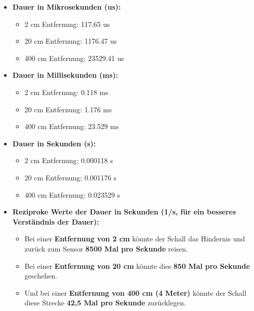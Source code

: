\documentclass{vorlage-design-main}
\begin{document}
\begin{itemize}

\item
  \textbf{Dauer in Mikrosekunden (us):}

  \begin{itemize}
  
  \item
    2 cm Entfernung: 117.65 us
  \item
    20 cm Entfernung: 1176.47 us
  \item
    400 cm Entfernung: 23529.41 us
  \end{itemize}
\item
  \textbf{Dauer in Millisekunden (ms):}

  \begin{itemize}
  
  \item
    2 cm Entfernung: 0.118 ms
  \item
    20 cm Entfernung: 1.176 ms
  \item
    400 cm Entfernung: 23.529 ms
  \end{itemize}
\item
  \textbf{Dauer in Sekunden (s):}

  \begin{itemize}
  
  \item
    2 cm Entfernung: 0.000118 s
  \item
    20 cm Entfernung: 0.001176 s
  \item
    400 cm Entfernung: 0.023529 s
  \end{itemize}
\item
  \textbf{Reziproke Werte der Dauer in Sekunden (1/s, für ein besseres
  Verständnis der Dauer):}

  \begin{itemize}
  
  \item
    Bei einer \textbf{Entfernung von 2 cm} könnte der Schall das
    Hindernis und zurück zum Sensor \textbf{8500 Mal pro Sekunde}
    reisen.
  \item
    Bei einer \textbf{Entfernung von 20 cm} könnte dies \textbf{850 Mal
    pro Sekunde} geschehen.
  \item
    Und bei einer \textbf{Entfernung von 400 cm (4 Meter)} könnte der
    Schall diese Strecke \textbf{42,5 Mal pro Sekunde} zurücklegen.
  \end{itemize}
\end{itemize}
\end{document}
